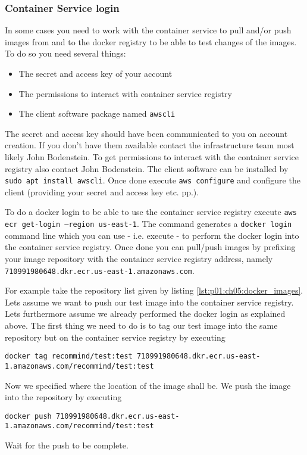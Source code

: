 			\subsubsection{\aws{} Container Service login}\label{p01:ch05:container_service_login}
			In some cases you need to work with the \aws{} container service to pull and/or push images from and to the docker registry to be able to test changes of the images. To do so you need several things:
			\begin{itemize}
				\item The secret and access key of your \aws{} account
				\item The permissions to interact with \aws{} container service registry
				\item The \aws{} client software package named \texttt{awscli}
			\end{itemize}
			The secret and access key should have been communicated to you on account creation. If you don't have them available contact the infrastructure team most likely John Bodenstein. To get permissions to interact with the \aws{} container service registry also contact John Bodenstein. The \aws{} client software can be installed by \texttt{sudo apt install awscli}. Once done execute \texttt{aws configure} and configure the \aws{} client (providing your secret and access key etc. pp.).
			
			To do a docker login to be able to use the \aws{} container service registry execute \texttt{aws ecr get-login --region us-east-1}. The command generates a \texttt{docker login} command line which you can use - i.e. execute - to perform the docker login into the \aws{} container service registry. Once done you can pull/push images by prefixing your image repository with the \aws{} container service registry address, namely \texttt{710991980648.dkr.ecr.us-east-1.amazonaws.com}. 
			
			For example take the repository list given by listing \ref{lst:p01:ch05:docker_images}. Lets assume we want to push our test image into the \aws{} container service registry. Lets furthermore assume we already performed the docker login as explained above. The first thing we need to do is to tag our test image into the same repository but on the \aws{} container service registry by executing
			\begin{center}
				\texttt{docker tag recommind/test:test 710991980648.dkr.ecr.us-east-1.amazonaws.com/recommind/test:test}
			\end{center}
			Now we specified where the location of the image shall be. We push the image into the repository by executing
			\begin{center}
				\texttt{docker push 710991980648.dkr.ecr.us-east-1.amazonaws.com/recommind/test:test}
                   \end{center}
                   Wait for the push to be complete.
                   

